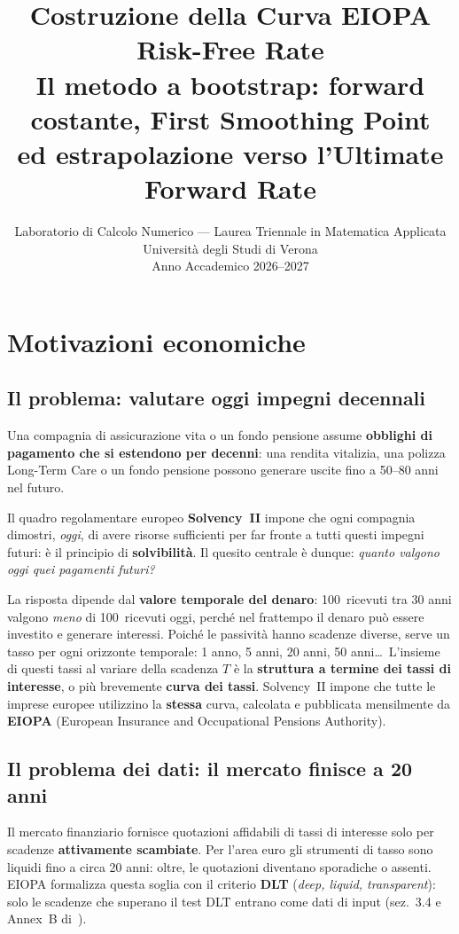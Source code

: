 \documentclass[11pt,a4paper]{article}
\title{%
  \textbf{Costruzione della Curva EIOPA Risk-Free Rate}\\[6pt]
  \large Il metodo a bootstrap: forward costante, First Smoothing Point\\[3pt]
  ed estrapolazione verso l'Ultimate Forward Rate\\[4pt]
}
\author{Laboratorio di Calcolo Numerico --- Laurea Triennale in Matematica Applicata\\
  Universit\`a degli Studi di Verona\\[2pt]
  Anno Accademico 2026--2027}
\date{}
\theoremstyle{plain}
\theoremstyle{definition}
\theoremstyle{remark}
\begin{document}
\maketitle
\tableofcontents
\newpage

\section{Motivazioni economiche}
\label{sec:motivazioni}

\subsection{Il problema: valutare oggi impegni decennali}

Una compagnia di assicurazione vita o un fondo pensione assume \textbf{obblighi di pagamento
che si estendono per decenni}: una rendita vitalizia, una polizza Long-Term Care o un fondo
pensione possono generare uscite fino a 50--80 anni nel futuro.

Il quadro regolamentare europeo \textbf{Solvency~II} impone che ogni compagnia dimostri,
\emph{oggi}, di avere risorse sufficienti per far fronte a tutti questi impegni futuri: \`e il
principio di \textbf{solvibilit\`a}. Il quesito centrale \`e dunque:
\emph{quanto valgono oggi quei pagamenti futuri?}

La risposta dipende dal \textbf{valore temporale del denaro}: 100\,\texteuro{} ricevuti tra
30 anni valgono \emph{meno} di 100\,\texteuro{} ricevuti oggi, perch\'e nel frattempo il
denaro pu\`o essere investito e generare interessi. Poich\'e le passivit\`a hanno scadenze
diverse, serve un tasso per ogni orizzonte temporale: 1 anno, 5 anni, 20 anni, 50 anni\ldots\
L'insieme di questi tassi al variare della scadenza $T$ \`e la \textbf{struttura a termine
dei tassi di interesse}, o pi\`u brevemente \textbf{curva dei tassi}. Solvency~II impone che
tutte le imprese europee utilizzino la \textbf{stessa} curva, calcolata e pubblicata
mensilmente da \textbf{EIOPA} (European Insurance and Occupational Pensions Authority).

\subsection{Il problema dei dati: il mercato finisce a 20 anni}
\label{sec:dati-mercato}

Il mercato finanziario fornisce quotazioni affidabili di tassi di interesse solo per scadenze
\textbf{attivamente scambiate}. Per l'area euro gli strumenti di tasso sono liquidi fino a
circa 20 anni: oltre, le quotazioni diventano sporadiche o assenti. EIOPA formalizza questa
soglia con il criterio \textbf{DLT} (\emph{deep, liquid, transparent}): solo le scadenze che
superano il test DLT entrano come dati di input (sez.~3.4 e Annex~B di~\cite{eiopa2026}).
\end{document}
